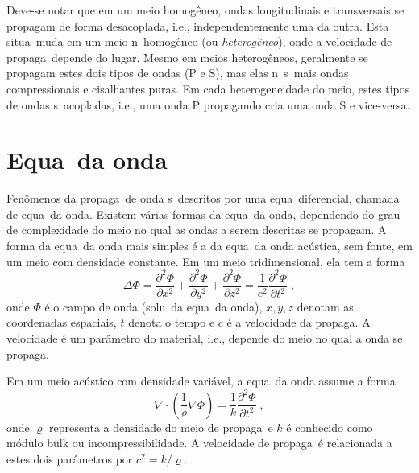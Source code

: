Deve-se notar que em um meio homog\^eneo, ondas longitudinais e
transversais se propagam de forma desacoplada, i.e., independentemente uma
da outra. Esta situa\cao\ muda em um meio n\ao\ homog\^eneo (ou {\it
heterog\^eneo}), onde a velocidade de propaga\cao\ depende do lugar.
Mesmo em meios heterog\^eneos, geralmente se propagam estes dois tipos de
ondas (P e S), mas elas n\ao\ s\ao\ mais ondas compressionais e cisalhantes
puras. Em cada heterogeneidade do meio, estes tipos de ondas s\ao\
acopladas, i.e., uma onda P propagando cria uma onda S e vice-versa.

\section{Equa\cao\ da onda}

Fen\^omenos da propaga\cao\ de onda s\ao\ descritos por uma equa\cao\
diferencial, chamada de equa\cao\ da onda. Existem v\'arias formas da
equa\cao\ da onda, dependendo do grau de complexidade do meio no qual as
ondas a serem descritas se propagam. A forma da equa\cao\ da onda mais
simples \'e a da equa\cao\ da onda ac\'ustica, sem fonte, em um meio com densidade
constante. Em um meio tridimensional, ela tem a forma
\begin{equation}
\Delta \Phi = 
\frac{\partial^2 \Phi}{\partial x^2} +
\frac{\partial^2 \Phi}{\partial y^2} +
\frac{\partial^2 \Phi}{\partial z^2}
= \frac{1}{c^2}
\frac{\partial^2 \Phi}{\partial t^2} \; ,
\label{eoadc}
\end{equation}
onde $\Phi$ \'e o campo de onda (solu\cao\ da equa\cao\ da onda), $x,y,z$ denotam as coordenadas espaciais, $t$ denota o tempo e $c$
\'e a velocidade da propaga\cao. A velocidade \'e um par\^ametro do
material, i.e., depende do meio no qual a onda se propaga.

Em um meio ac\'ustico com densidade vari\'avel, a equa\cao\ da onda
assume a forma
\begin{equation}
\nabla\cdot \left(\frac{1}{\varrho} \nabla \Phi \right)
= \frac{1}{k}
\frac{\partial^2 \Phi}{\partial t^2} \; ,
\label{eoadv}
\end{equation}
onde $\varrho$ representa a densidade do meio de propaga\cao\ e $k$ \'e
conhecido como m\'odulo bulk ou incompressibilidade. A velocidade de
propaga\cao\ \'e relacionada a estes dois par\^ametros por
$c^2=k/\varrho$.

